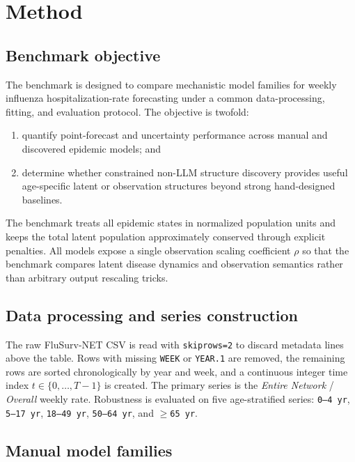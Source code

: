 \section{Method}

\subsection{Benchmark objective}

The benchmark is designed to compare mechanistic model families for weekly
influenza hospitalization-rate forecasting under a common data-processing,
fitting, and evaluation protocol. The objective is twofold:
\begin{enumerate}[leftmargin=1.5em]
\item quantify point-forecast and uncertainty performance across manual and
discovered epidemic models; and
\item determine whether constrained non-LLM structure discovery provides
useful age-specific latent or observation structures beyond strong hand-designed
baselines.
\end{enumerate}

The benchmark treats all epidemic states in normalized population units and
keeps the total latent population approximately conserved through explicit
penalties. All models expose a single observation scaling coefficient $\rho$ so
that the benchmark compares latent disease dynamics and observation semantics
rather than arbitrary output rescaling tricks.

\subsection{Data processing and series construction}

The raw FluSurv-NET CSV is read with \texttt{skiprows=2} to discard metadata
lines above the table. Rows with missing \texttt{WEEK} or \texttt{YEAR.1} are
removed, the remaining rows are sorted chronologically by year and week, and a
continuous integer time index $t \in \{0, \dots, T-1\}$ is created. The primary
series is the \emph{Entire Network} / \emph{Overall} weekly rate. Robustness is
evaluated on five age-stratified series:
\texttt{0--4 yr}, \texttt{5--17 yr}, \texttt{18--49 yr},
\texttt{50--64 yr}, and \texttt{$\geq$65 yr}.

\subsection{Manual model families}

